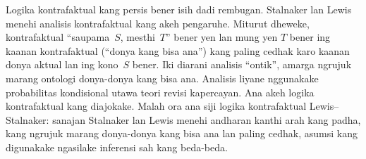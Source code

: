\documentclass[../../../include/open-logic-section]{subfiles}
\begin{document}
Logika kontrafaktual kang persis bener isih dadi rembugan.
Stalnaker lan Lewis menehi analisis kontrafaktual kang akeh
pengaruhe. Miturut dheweke, kontrafaktual ``saupama~$S$,
mesthi~$T$'' bener yen lan mung yen $T$ bener ing kaanan
kontrafaktual (``donya kang bisa ana'') kang paling cedhak
karo kaanan donya aktual lan ing kono~$S$ bener. Iki diarani
analisis ``ontik'', amarga ngrujuk marang ontologi donya-donya
kang bisa ana. Analisis liyane nggunakake probabilitas
kondisional utawa teori revisi kapercayan. Ana akeh logika
kontrafaktual kang diajokake. Malah ora ana siji logika
kontrafaktual Lewis--Stalnaker: sanajan Stalnaker lan Lewis
menehi andharan kanthi arah kang padha, kang ngrujuk marang
donya-donya kang bisa ana lan paling cedhak, asumsi kang
digunakake ngasilake inferensi sah kang beda-beda.
\end{document}
